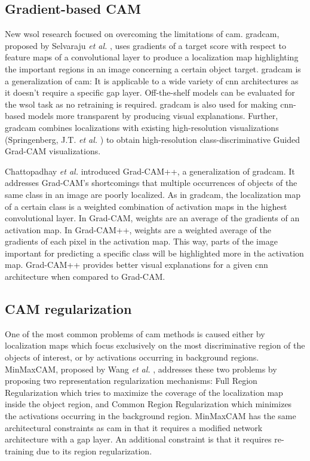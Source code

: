 \subsection{Gradient-based CAM}
New \acrshort{wsol} research focused on overcoming the limitations of \acrshort{cam}. \acrfull{gradcam}, proposed by Selvaraju \textit{et al.} \cite{selvaraju2017grad}, uses gradients of a target score with respect to feature maps of a convolutional layer to produce a localization map highlighting the important regions in an image concerning a certain object target. \acrshort{gradcam} is a generalization of \acrshort{cam}: It is applicable to a wide variety of \acrshort{cnn} architectures as it doesn't require a specific \acrshort{gap} layer. Off-the-shelf models can be evaluated for the \acrshort{wsol} task as no retraining is required. \acrshort{gradcam} is also used for making \acrshort{cnn}-based models more transparent by producing visual explanations. Further, \acrshort{gradcam} combines localizations with existing high-resolution visualizations (Springenberg, J.T. \textit{et al.} \cite{springenberg2014striving}) to obtain high-resolution class-discriminative Guided Grad-CAM visualizations.

Chattopadhay \textit{et al.} \cite{chattopadhay2018grad, chattopadhyay2017grad} introduced Grad-CAM++, a generalization of \acrshort{gradcam}. It addresses Grad-CAM's shortcomings that multiple occurrences of objects of the same class in an image are poorly localized. As in \acrshort{gradcam}, the localization map of a certain class is a weighted combination of activation maps in the highest convolutional layer. In Grad-CAM, weights are an average of the gradients of an activation map. In Grad-CAM++, weights are a weighted average of the gradients of each pixel in the activation map. This way, parts of the image important for predicting a specific class will be highlighted more in the activation map. Grad-CAM++ provides better visual explanations for a given \acrshort{cnn} architecture when compared to Grad-CAM.

\subsection{CAM regularization}
One of the most common problems of \acrshort{cam} methods is caused either by localization maps which focus exclusively on the most discriminative region of the objects of interest, or by activations occurring in background regions. MinMaxCAM, proposed by Wang \textit{et al.} \cite{wang2021minmaxcam}, addresses these two problems by proposing two representation regularization mechanisms: Full Region Regularization which tries to maximize the coverage of the localization map inside the object region, and Common Region Regularization which minimizes the activations occurring in the background region. MinMaxCAM has the same architectural constraints as \acrshort{cam} in that it requires a modified network architecture with a \acrshort{gap} layer. An additional constraint is that it requires re-training due to its region regularization.

